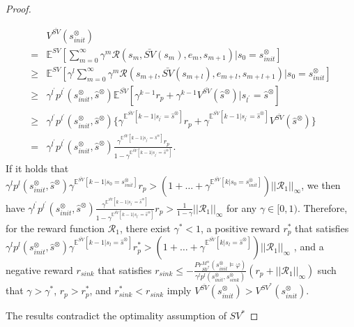 \documentclass[10pt]{article}
\theoremstyle{definition}
\begin{document}
\begin{proof}
\begin{enumerate}
    \begin{align}
      & V^{\bar{SV}}(s^{\otimes}_{init}) \nonumber \\
      = & \mathbb{E}^{SV}[ {\sum_{m=0}^{\infty}} \gamma^m \mathcal{R}(s_m, \bar{SV}(s_m), e_m, s_{m+1}) | s_0 = s^{\otimes}_{init} ] \nonumber \\
      \geq & \mathbb{E}^{SV}[ \gamma^l \sum_{m=0}^{\infty} \gamma^m \mathcal{R}(s_{m+l}, \bar{SV}(s_{m+l}), e_{m+l}, s_{m+l+1}) | s_0 = s^{\otimes}_{init} ] \nonumber \\
      \geq & \gamma^{l^{\prime}} p^{l^{\prime}}(s^{\otimes}_{init}, \hat{s}^{\otimes}) \mathbb{E}^{\bar{SV}} [ \gamma^{k-1} r_p + \gamma^{k-1} V^{\bar{SV}}(\hat{s}^{\otimes}) | s_{l^{\prime}} = \hat{s}^{\otimes} ] \nonumber \\
      \geq & \gamma^{l^{\prime}} p^{l^{\prime}}(s^{\otimes}_{init}, \hat{s}^{\otimes}) \{ \gamma^{\mathbb{E}^{\bar{SV}}[k - 1 | s_{l^{\prime}} = \hat{s}^{\otimes} ]} r_p + \gamma^{\mathbb{E}^{\bar{SV}}[k - 1 | s_{l^{\prime}} = \hat{s}^{\otimes} ]} V^{\bar{SV}}(\hat{s}^{\otimes}) \} \nonumber \\
      = & \gamma^{l^{\prime}} p^{l^{\prime}}(s^{\otimes}_{init}, \hat{s}^{\otimes}) \frac{ \gamma^{\mathbb{E}^{\bar{SV}}[k - 1 | s_{l^{\prime}} = \hat{s}^{\otimes} ]} r_p } { 1 - \gamma^{\mathbb{E}^{\bar{SV}}[k - 1 | s_{l^{\prime}} = \hat{s}^{\otimes}]}}. \nonumber
    \end{align}
    If it holds that $\gamma^{l} p^{l}(s^{\otimes}_{init}, \hat{s}^{\otimes}) \gamma^{\mathbb{E}^{\bar{SV}}[k - 1 | s_0 = s^{\otimes}_{init} ]} r_p > (1 + \ldots + \gamma^{\mathbb{E}^{\bar{SV}}[k | s_0 = s^{\otimes}_{init} ]} ) ||\mathcal{R}_1||_{\infty}$, we then have $ \gamma^{l^{\prime}} p^{l^{\prime}}(s^{\otimes}_{init}, \hat{s}^{\otimes}) \frac{ \gamma^{\mathbb{E}^{\bar{SV}}[k - 1 | s_{l^{\prime}} = \hat{s}^{\otimes} ]} } { 1 - \gamma^{\mathbb{E}^{\bar{SV}}[k - 1 | s_{l^{\prime}} = \hat{s}^{\otimes} ]}} r_p > \frac{1}{1-\gamma} ||\mathcal{R}_1||_{\infty}$ for any $\gamma \in [0,1)$.
    Therefore, for the reward function $\mathcal{R}_1$, there exist $\gamma^{\ast} < 1$, a positive reward $r^{\ast}_p$ that satisfies $\gamma^{l} p^{l}(s^{\otimes}_{init}, \hat{s}^{\otimes}) \gamma^{\mathbb{E}^{\bar{SV}}[k - 1 | s_{l} = \hat{s}^{\otimes} ]} r^{\ast}_p > (1 + \ldots + \gamma^{\mathbb{E}^{\bar{SV}}[k | s_{l} = \hat{s}^{\otimes} ]} ) ||\mathcal{R}_1||_{\infty}$ , and a negative reward $r_{sink}$ that satisfies $r_{sink} \leq - \frac{Pr^{M^{\otimes}}_{SV^{\ast}}(s^{\otimes}_{init} \models \varphi)}{ \gamma^l p^l (s^{\otimes}_{init}, s^{\otimes}_{sink})} (r_p + ||\mathcal{R}_1||_{\infty})$ such that $\gamma > \gamma^{\ast} $, $r_p > r^{\ast}_p$, and $r^{\ast}_{sink} < r_{sink}$ imply $V^{\bar{SV}}(s^{\otimes}_{init}) > V^{SV^{\ast}}(s^{\otimes}_{init})$.
  \end{enumerate}

  The results contradict the optimality assumption of $SV^{\ast}$
\end{proof}
\end{document}
